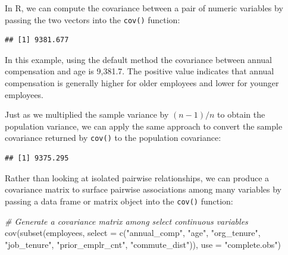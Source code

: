 \documentclass[
]{book}
\newenvironment{Shaded}{\begin{snugshade}}{\end{snugshade}}
\newcommand{\AttributeTok}[1]{\textcolor[rgb]{0.77,0.63,0.00}{#1}}
\newcommand{\CommentTok}[1]{\textcolor[rgb]{0.56,0.35,0.01}{\textit{#1}}}
\newcommand{\DecValTok}[1]{\textcolor[rgb]{0.00,0.00,0.81}{#1}}
\newcommand{\FunctionTok}[1]{\textcolor[rgb]{0.00,0.00,0.00}{#1}}
\newcommand{\NormalTok}[1]{#1}
\newcommand{\SpecialCharTok}[1]{\textcolor[rgb]{0.00,0.00,0.00}{#1}}
\newcommand{\StringTok}[1]{\textcolor[rgb]{0.31,0.60,0.02}{#1}}
\begin{document}
In R, we can compute the covariance between a pair of numeric variables by passing the two vectors into the \texttt{cov()} function:

\begin{Shaded}
\end{Shaded}

\begin{verbatim}
## [1] 9381.677
\end{verbatim}

In this example, using the default method the covariance between annual compensation and age is 9,381.7. The positive value indicates that annual compensation is generally higher for older employees and lower for younger employees.

Just as we multiplied the sample variance by \((n - 1) / n\) to obtain the population variance, we can apply the same approach to convert the sample covariance returned by \texttt{cov()} to the population covariance:

\begin{Shaded}
\end{Shaded}

\begin{verbatim}
## [1] 9375.295
\end{verbatim}

Rather than looking at isolated pairwise relationships, we can produce a covariance matrix to surface pairwise associations among many variables by passing a data frame or matrix object into the \texttt{cov()} function:

\begin{Shaded}
\begin{Highlighting}[]
\CommentTok{\# Generate a covariance matrix among select continuous variables}
\FunctionTok{cov}\NormalTok{(}\FunctionTok{subset}\NormalTok{(employees, }\AttributeTok{select =} \FunctionTok{c}\NormalTok{(}\StringTok{"annual\_comp"}\NormalTok{, }\StringTok{"age"}\NormalTok{, }\StringTok{"org\_tenure"}\NormalTok{, }\StringTok{"job\_tenure"}\NormalTok{, }\StringTok{"prior\_emplr\_cnt"}\NormalTok{, }\StringTok{"commute\_dist"}\NormalTok{)), }\AttributeTok{use =} \StringTok{"complete.obs"}\NormalTok{)}
\end{Highlighting}
\end{Shaded}
\end{document}
